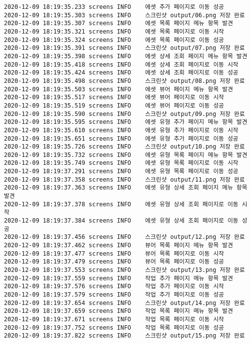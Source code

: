 \begin{Verbatim}[fontsize=\tiny, breaklines=true, breakanywhere=true]
2020-12-09 18:19:35.233 screens	INFO	에셋 추가 페이지로 이동 성공
2020-12-09 18:19:35.303 screens	INFO	스크린샷 output/06.png 저장 완료
2020-12-09 18:19:35.307 screens	INFO	에셋 목록 페이지 메뉴 항목 발견
2020-12-09 18:19:35.321 screens	INFO	에셋 목록 페이지로 이동 시작
2020-12-09 18:19:35.324 screens	INFO	에셋 목록 페이지로 이동 성공
2020-12-09 18:19:35.391 screens	INFO	스크린샷 output/07.png 저장 완료
2020-12-09 18:19:35.398 screens	INFO	에셋 상세 조회 페이지 메뉴 항목 발견
2020-12-09 18:19:35.418 screens	INFO	에셋 상세 조회 페이지로 이동 시작
2020-12-09 18:19:35.424 screens	INFO	에셋 상세 조회 페이지로 이동 성공
2020-12-09 18:19:35.498 screens	INFO	스크린샷 output/08.png 저장 완료
2020-12-09 18:19:35.503 screens	INFO	에셋 뷰어 페이지 메뉴 항목 발견
2020-12-09 18:19:35.517 screens	INFO	에셋 뷰어 페이지로 이동 시작
2020-12-09 18:19:35.519 screens	INFO	에셋 뷰어 페이지로 이동 성공
2020-12-09 18:19:35.590 screens	INFO	스크린샷 output/09.png 저장 완료
2020-12-09 18:19:35.595 screens	INFO	에셋 유형 추가 페이지 메뉴 항목 발견
2020-12-09 18:19:35.610 screens	INFO	에셋 유형 추가 페이지로 이동 시작
2020-12-09 18:19:35.651 screens	INFO	에셋 유형 추가 페이지로 이동 성공
2020-12-09 18:19:35.726 screens	INFO	스크린샷 output/10.png 저장 완료
2020-12-09 18:19:35.732 screens	INFO	에셋 유형 목록 페이지 메뉴 항목 발견
2020-12-09 18:19:35.749 screens	INFO	에셋 유형 목록 페이지로 이동 시작
2020-12-09 18:19:37.291 screens	INFO	에셋 유형 목록 페이지로 이동 성공
2020-12-09 18:19:37.358 screens	INFO	스크린샷 output/11.png 저장 완료
2020-12-09 18:19:37.363 screens	INFO	에셋 유형 상세 조회 페이지 메뉴 항목 발견
2020-12-09 18:19:37.378 screens	INFO	에셋 유형 상세 조회 페이지로 이동 시작
2020-12-09 18:19:37.384 screens	INFO	에셋 유형 상세 조회 페이지로 이동 성공
2020-12-09 18:19:37.456 screens	INFO	스크린샷 output/12.png 저장 완료
2020-12-09 18:19:37.462 screens	INFO	뷰어 목록 페이지 메뉴 항목 발견
2020-12-09 18:19:37.477 screens	INFO	뷰어 목록 페이지로 이동 시작
2020-12-09 18:19:37.479 screens	INFO	뷰어 목록 페이지로 이동 성공
2020-12-09 18:19:37.553 screens	INFO	스크린샷 output/13.png 저장 완료
2020-12-09 18:19:37.559 screens	INFO	작업 추가 페이지 메뉴 항목 발견
2020-12-09 18:19:37.576 screens	INFO	작업 추가 페이지로 이동 시작
2020-12-09 18:19:37.579 screens	INFO	작업 추가 페이지로 이동 성공
2020-12-09 18:19:37.654 screens	INFO	스크린샷 output/14.png 저장 완료
2020-12-09 18:19:37.659 screens	INFO	작업 목록 페이지 메뉴 항목 발견
2020-12-09 18:19:37.671 screens	INFO	작업 목록 페이지로 이동 시작
2020-12-09 18:19:37.752 screens	INFO	작업 목록 페이지로 이동 성공
2020-12-09 18:19:37.822 screens	INFO	스크린샷 output/15.png 저장 완료

\end{Verbatim}
